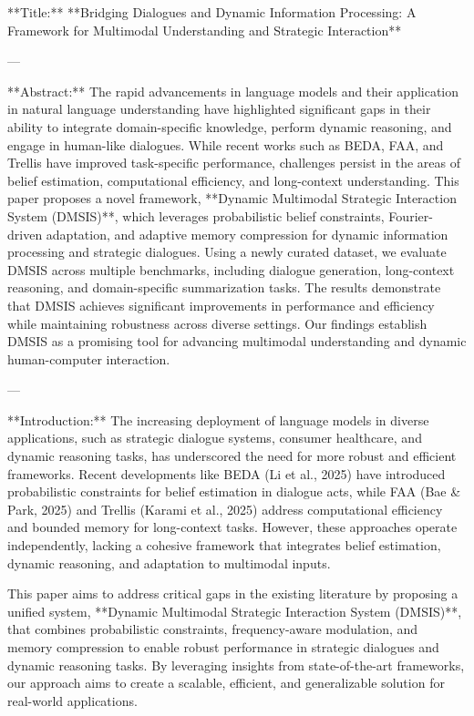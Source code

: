 **Title:**  
**Bridging Dialogues and Dynamic Information Processing: A Framework for Multimodal Understanding and Strategic Interaction**

---

**Abstract:**  
The rapid advancements in language models and their application in natural language understanding have highlighted significant gaps in their ability to integrate domain-specific knowledge, perform dynamic reasoning, and engage in human-like dialogues. While recent works such as BEDA, FAA, and Trellis have improved task-specific performance, challenges persist in the areas of belief estimation, computational efficiency, and long-context understanding. This paper proposes a novel framework, **Dynamic Multimodal Strategic Interaction System (DMSIS)**, which leverages probabilistic belief constraints, Fourier-driven adaptation, and adaptive memory compression for dynamic information processing and strategic dialogues. Using a newly curated dataset, we evaluate DMSIS across multiple benchmarks, including dialogue generation, long-context reasoning, and domain-specific summarization tasks. The results demonstrate that DMSIS achieves significant improvements in performance and efficiency while maintaining robustness across diverse settings. Our findings establish DMSIS as a promising tool for advancing multimodal understanding and dynamic human-computer interaction.

---

**Introduction:**  
The increasing deployment of language models in diverse applications, such as strategic dialogue systems, consumer healthcare, and dynamic reasoning tasks, has underscored the need for more robust and efficient frameworks. Recent developments like BEDA (Li et al., 2025) have introduced probabilistic constraints for belief estimation in dialogue acts, while FAA (Bae & Park, 2025) and Trellis (Karami et al., 2025) address computational efficiency and bounded memory for long-context tasks. However, these approaches operate independently, lacking a cohesive framework that integrates belief estimation, dynamic reasoning, and adaptation to multimodal inputs.

This paper aims to address critical gaps in the existing literature by proposing a unified system, **Dynamic Multimodal Strategic Interaction System (DMSIS)**, that combines probabilistic constraints, frequency-aware modulation, and memory compression to enable robust performance in strategic dialogues and dynamic reasoning tasks. By leveraging insights from state-of-the-art frameworks, our approach aims to create a scalable, efficient, and generalizable solution for real-world applications.

